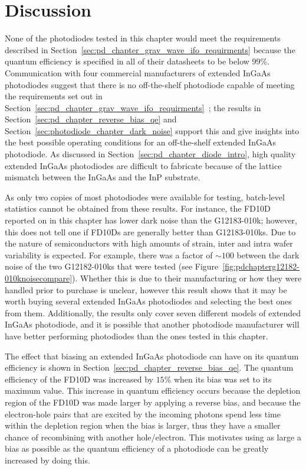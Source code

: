 \section{Discussion}
None of the photodiodes tested in this chapter would meet the requirements described in Section~\ref{sec:pd_chapter_grav_wave_ifo_requirments} because the quantum efficiency is specified in all of their datasheets to be below 99\%. Communication with four commercial manufacturers of extended InGaAs photodiodes suggest that there is no off-the-shelf photodiode capable of meeting the requirements set out in Section~\ref{sec:pd_chapter_grav_wave_ifo_requirments}~\cite{Gasparian2018,Hornby2018,Miron2018,Kalinina2018}; the results in Section~\ref{sec:pd_chapter_reverse_bias_qe} and Section~\ref{sec:photodiode_chapter_dark_noise} support this and give insights into the best possible operating conditions for an off-the-shelf extended InGaAs photodiode. As discussed in Section~\ref{sec:pd_chapter_diode_intro}, high quality extended InGaAs photodiodes are difficult to fabricate because of the lattice mismatch between the InGaAs and the InP substrate.
\par
As only two copies of most photodiodes were available for testing, batch-level statistics cannot be obtained from these results. For instance, the FD10D reported on in this chapter has lower dark noise than the G12183-010k; however, this does not tell one if FD10Ds are generally better than G12183-010ks. Due to the nature of semiconductors with high amounts of strain, inter and intra wafer variability is expected. For example, there was a factor of $\sim\!100$ between the dark noise of the two G12182-010ks that were tested (see Figure~\ref{fig:pdchapterg12182-010knoisecompare}). Whether this is due to their manufacturing or how they were handled prior to purchase is unclear, however this result shows that it may be worth buying several extended InGaAs photodiodes and selecting the best ones from them. Additionally, the results only cover seven different models of extended InGaAs photodiode, and it is possible that another photodiode manufacturer will have better performing photodiodes than the ones tested in this chapter.
\par
The effect that biasing an extended InGaAs photodiode can have on its quantum efficiency is shown in Section~\ref{sec:pd_chapter_reverse_bias_qe}. The quantum efficiency of the FD10D was increased by $15\%$ when its bias was set to its maximum value. This increase in quantum efficiency occurs because the depletion region of the FD10D was made larger by applying a reverse bias, and because the electron-hole pairs that are excited by the incoming photons spend less time within the depletion region when the bias is larger, thus they have a smaller chance of recombining with another hole/electron. This motivates using as large a bias as possible as the quantum efficiency of a photodiode can be greatly increased by doing this.
